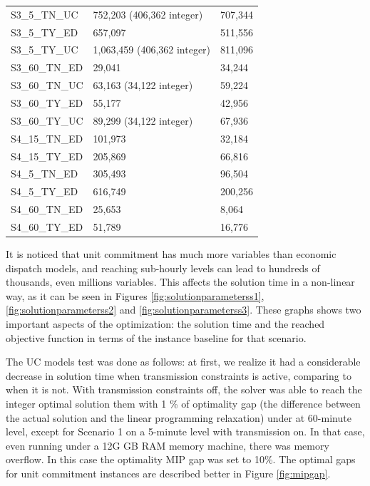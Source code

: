 \documentclass[12pt,LUDisStyle,twosided]{book}
\begin{document}
\begin{table}[H]
{\begin{tabular}{|l|l|l|}
S3\_5\_TN\_UC&752,203 (406,362 integer)&707,344\\
S3\_5\_TY\_ED&657,097&511,556\\
S3\_5\_TY\_UC&1,063,459 (406,362 integer)&811,096\\
S3\_60\_TN\_ED&29,041&34,244\\
S3\_60\_TN\_UC&63,163 (34,122 integer)&59,224\\
S3\_60\_TY\_ED&55,177&42,956\\
S3\_60\_TY\_UC&89,299 (34,122 integer)&67,936\\
S4\_15\_TN\_ED&101,973&32,184\\
S4\_15\_TY\_ED&205,869&66,816\\
S4\_5\_TN\_ED&305,493&96,504\\
S4\_5\_TY\_ED&616,749&200,256\\
S4\_60\_TN\_ED&25,653&8,064\\
S4\_60\_TY\_ED&51,789&16,776\\
\hline
\end{tabular}
}
\label{table:modelparameters}
\end{table}

It is noticed that unit commitment has much more variables than economic dispatch models, and reaching sub-hourly levels can lead to hundreds of thousands, even millions variables. This affects the solution time in a non-linear way, as it can be seen in Figures \ref{fig:solutionparameterss1}, \ref{fig:solutionparameterss2} and \ref{fig:solutionparameterss3}. These graphs shows two important aspects of the optimization: the solution time and the reached objective function in terms of the instance baseline for that scenario.

The UC models test was done as follows: at first, we realize it had a considerable decrease in solution time when transmission constraints is active, comparing to when it is not. With transmission constraints off, the solver was able to reach the integer optimal solution them with 1 \% of optimality gap (the difference between the actual solution and the linear programming relaxation) under at 60-minute level, except for Scenario 1 on a 5-minute level with transmission on. In that case, even running under a 12G GB RAM memory machine, there was memory overflow. In this case the optimality MIP gap was set to 10\%. The optimal gaps for unit commitment instances are described better in Figure \ref{fig:mipgap}.
\end{document}
